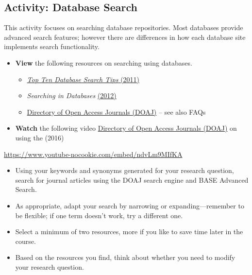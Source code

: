\documentclass[
  letterpaper,
  DIV=11,
  numbers=noendperiod]{scrreprt}
\providecommand{\tightlist}{%
  \setlength{\itemsep}{0pt}\setlength{\parskip}{0pt}}\usepackage{longtable,booktabs,array}
\begin{document}
\begin{tcolorbox}
\begin{tcolorbox}
\end{tcolorbox}

\subsection{Activity: Database Search}\label{activity-database-search}

\begin{tcolorbox}[enhanced jigsaw, toprule=.15mm, colback=white, colframe=quarto-callout-note-color-frame, bottomtitle=1mm, leftrule=.75mm, coltitle=black, titlerule=0mm, rightrule=.15mm, colbacktitle=quarto-callout-note-color!10!white, left=2mm, title={Learning Activity}, opacitybacktitle=0.6, opacityback=0, breakable, toptitle=1mm, arc=.35mm, bottomrule=.15mm]

This activity focuses on searching database repositories. Most databases
provide advanced search features; however there are differences in how
each database site implements search functionality.

\begin{itemize}
\tightlist
\item
  \textbf{View} the following resources on searching using databases.

  \begin{itemize}
  \tightlist
  \item
    \href{https://www.berkeleycitycollege.edu/library/2011/04/04/databasesearchtips/}{\emph{Top
    Ten Database Search Tips} (2011)}
  \item
    \emph{Searching in Databases}
    \href{https://web.library.uq.edu.au/research-tools-techniques/search-techniques/where-and-how-search/searching-databases}{(2012)}
  \item
    \href{https://doaj.org/}{Directory of Open Access Journals (DOAJ)}
    -- see also FAQs
  \end{itemize}
\item
  \textbf{Watch} the following video
  \href{https://www.youtube-nocookie.com/embed/ndvLm9MIfKA}{Directory of
  Open Access Journals (DOAJ)} on using the (2016)
\end{itemize}

\url{https://www.youtube-nocookie.com/embed/ndvLm9MIfKA}

\begin{itemize}
\tightlist
\item
  Using your keywords and synonyms generated for your research question,
  search for journal articles using the DOAJ search engine and BASE
  Advanced Search.
\item
  As appropriate, adapt your search by narrowing or expanding---remember
  to be flexible; if one term doesn't work, try a different one.
\item
  Select a minimum of two resources, more if you like to save time later
  in the course.
\item
  Based on the resources you find, think about whether you need to
  modify your research question.
\end{itemize}


\end{tcolorbox}
\end{tcolorbox}
\end{document}
